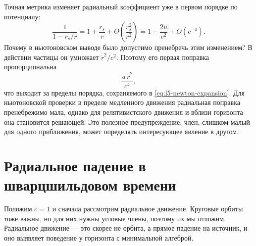 Точная метрика изменяет радиальный коэффициент уже в первом порядке по потенциалу:
\begin{equation}
\frac{1}{1-r_s/r}
=1+\frac{r_s}{r}
+O\!\left(\frac{r_s^2}{r^2}\right)
=1-\frac{2u}{c^2}+O(c^{-4}).
\label{eq:l5-radial-expansion}
\end{equation}
Почему в ньютоновском выводе было допустимо пренебречь этим изменением?
В действии частицы он умножает \(\dot r^2/c^2\). Поэтому его первая поправка пропорциональна
\begin{equation}
\frac{u\,\dot r^2}{c^4},
\end{equation}
что выходит за пределы порядка, сохраняемого в
\eqref{eq:l5-newton-expansion}. Для ньютоновской проверки в пределе медленного движения радиальная поправка пренебрежимо мала, однако для релятивистского движения и вблизи горизонта она становится решающей. Это полезное предупреждение: член, слишком малый для одного приближения, может определять интересующее явление в другом.

\section{Радиальное падение в шварцшильдовом времени}

Положим \(c=1\) и сначала рассмотрим радиальное движение. Круговые орбиты тоже важны, но для них нужны угловые члены, поэтому их мы отложим. Радиальное движение — это скорее не орбита, а прямое падение на источник, и оно выявляет поведение у горизонта с минимальной алгеброй.

\begin{classroomqa}
\end{classroomqa}

